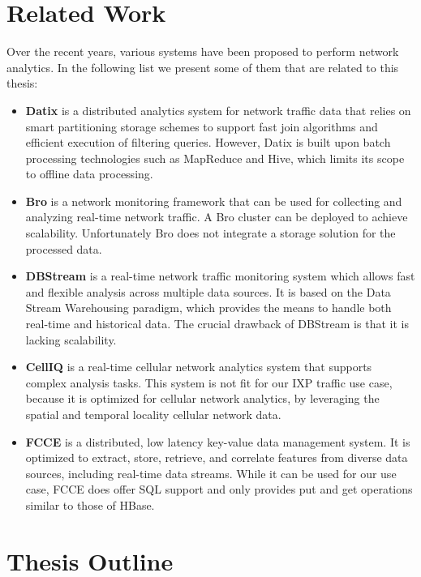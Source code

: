 \section{Related Work}

Over the recent years, various systems have been proposed to perform network analytics. In the following list we present some of them that are related to this thesis:
\begin{itemize}
\item \textbf{Datix} \cite{datix} is a distributed analytics system for network traffic data that relies on smart partitioning storage schemes to support fast join algorithms and efficient execution of filtering queries. However, Datix is built upon batch processing technologies such as MapReduce and Hive, which limits its scope to offline data processing. 
\item \textbf{Bro} \cite{bro} is a network monitoring framework that can be used for collecting and analyzing real-time network traffic. A Bro cluster can be deployed to achieve scalability. Unfortunately Bro does not integrate a storage solution for the processed data.
\item \textbf{DBStream} \cite{dbstream} is a real-time network traffic monitoring system which allows fast and flexible analysis across multiple data sources. It is based on the Data Stream Warehousing paradigm, which provides the means to handle both real-time and historical data. The crucial drawback of DBStream is that it is lacking scalability.
\item \textbf{CellIQ} \cite{celliq} is a real-time cellular network analytics system that supports complex analysis tasks. This system is not fit for our IXP traffic use case, because it is optimized for cellular network analytics, by leveraging the spatial and temporal locality cellular network data.
\item \textbf{FCCE} \cite{fcce} is a distributed, low latency key-value data management system. It is optimized to extract, store, retrieve, and correlate features from diverse data sources, including real-time data streams. While it can be used for our use case, FCCE does offer SQL support and only provides put and get operations similar to those of HBase.
\end{itemize}


\section{Thesis Outline}

